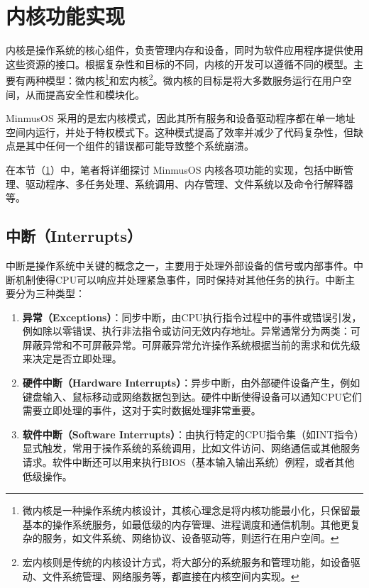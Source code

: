 \section{内核功能实现}\label{sec:KernelFunctionalityImplementation}

内核是操作系统的核心组件，负责管理内存和设备，同时为软件应用程序提供使用这些资源的接口。根据复杂性和目标的不同，内核的开发可以遵循不同的模型。主要有两种模型：微内核\footnote{微内核是一种操作系统内核设计，其核心理念是将内核功能最小化，只保留最基本的操作系统服务，如最低级的内存管理、进程调度和通信机制。其他更复杂的服务，如文件系统、网络协议、设备驱动等，则运行在用户空间。}和宏内核\footnote{宏内核则是传统的内核设计方式，将大部分的系统服务和管理功能，如设备驱动、文件系统管理、网络服务等，都直接在内核空间内实现。}。微内核的目标是将大多数服务运行在用户空间，从而提高安全性和模块化。

MinmusOS 采用的是宏内核模式，因此其所有服务和设备驱动程序都在单一地址空间内运行，并处于特权模式下。这种模式提高了效率并减少了代码复杂性，但缺点是其中任何一个组件的错误都可能导致整个系统崩溃。

在本节（\cref{sec:KernelFunctionalityImplementation}）中，笔者将详细探讨 MinmusOS 内核各项功能的实现，包括中断管理、驱动程序、多任务处理、系统调用、内存管理、文件系统以及命令行解释器等。

\subsection{中断（Interrupts）}

中断是操作系统中关键的概念之一，主要用于处理外部设备的信号或内部事件。中断机制使得CPU可以响应并处理紧急事件，同时保持对其他任务的执行。中断主要分为三种类型：

\begin{enumerate}
    \item \textbf{异常（Exceptions）}：同步中断，由CPU执行指令过程中的事件或错误引发，例如除以零错误、执行非法指令或访问无效内存地址。异常通常分为两类：可屏蔽异常和不可屏蔽异常。可屏蔽异常允许操作系统根据当前的需求和优先级来决定是否立即处理。
    \item \textbf{硬件中断（Hardware Interrupts）}：异步中断，由外部硬件设备产生，例如键盘输入、鼠标移动或网络数据包到达。硬件中断使得设备可以通知CPU它们需要立即处理的事件，这对于实时数据处理非常重要。
    \item \textbf{软件中断（Software Interrupts）}：由执行特定的CPU指令集（如INT指令）显式触发，常用于操作系统的系统调用，比如文件访问、网络通信或其他服务请求。软件中断还可以用来执行BIOS（基本输入输出系统）例程，或者其他低级操作。
\end{enumerate}

